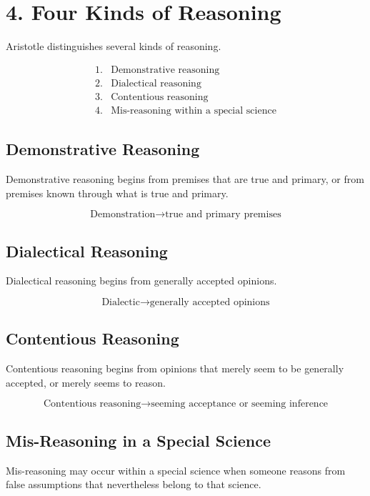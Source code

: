 \documentclass[12pt]{article}
\begin{document}
\section*{4. Four Kinds of Reasoning}

Aristotle distinguishes several kinds of reasoning.

\[
\begin{array}{ll}
1. & \text{Demonstrative reasoning} \\
2. & \text{Dialectical reasoning} \\
3. & \text{Contentious reasoning} \\
4. & \text{Mis-reasoning within a special science}
\end{array}
\]

\subsection*{Demonstrative Reasoning}

Demonstrative reasoning begins from premises that are true and primary, or from
premises known through what is true and primary.

\[
\boxed{
\text{Demonstration} \rightarrow \text{true and primary premises}
}
\]

\subsection*{Dialectical Reasoning}

Dialectical reasoning begins from generally accepted opinions.

\[
\boxed{
\text{Dialectic} \rightarrow \text{generally accepted opinions}
}
\]

\subsection*{Contentious Reasoning}

Contentious reasoning begins from opinions that merely seem to be generally
accepted, or merely seems to reason.

\[
\boxed{
\text{Contentious reasoning} \rightarrow \text{seeming acceptance or seeming inference}
}
\]

\subsection*{Mis-Reasoning in a Special Science}

Mis-reasoning may occur within a special science when someone reasons from
false assumptions that nevertheless belong to that science.
\end{document}
